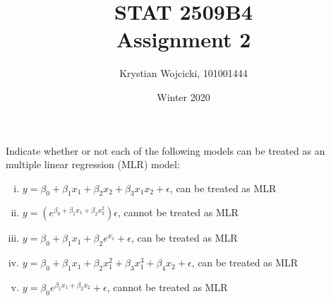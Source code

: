 \documentclass{article}
\title{STAT 2509B4 \\
	\large{Assignment 2}}
\author{Krystian Wojcicki, 101001444}
\date{Winter 2020}
\begin{document}
\maketitle


Indicate whether or not each of the following models can be treated as an multiple linear
regression (MLR) model:
\begin{enumerate}[(i)]

\item  $y = \beta_0 + \beta_1x_1 + \beta_2x_2 + \beta_3x_1x_2 + \epsilon $, can be treated as MLR
\item  $y = (e^{\beta_0 + \beta_1x_1 + \beta_2x_2^2})\epsilon$, cannot be treated as MLR
\item  $y = \beta_0 + \beta_1x_1 + \beta_2e^{x_1} + \epsilon$, can be treated as MLR
\item  $y = \beta_0 + \beta_1x_1 + \beta_2x_1^2 + \beta_3x_1^3 + \beta_4x_2 + \epsilon$, can be treated as MLR
\item $y = \beta_0e^{\beta_1x_1 + \beta_2x_2} + \epsilon$, cannot be treated as MLR

\end{enumerate}
\end{document}
